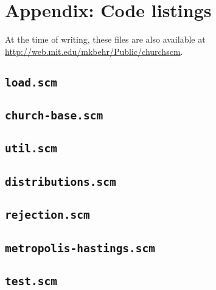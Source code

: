 \documentclass{article}
\begin{document}



\section{Appendix: Code listings}

At the time of writing, these files are also available at \url{http://web.mit.edu/mkbehr/Public/churchscm}.

\subsection{\texttt{load.scm}}


\subsection{\texttt{church-base.scm}}


\subsection{\texttt{util.scm}}


\subsection{\texttt{distributions.scm}}


\subsection{\texttt{rejection.scm}}


\subsection{\texttt{metropolis-hastings.scm}}


\subsection{\texttt{test.scm}}

\end{document}

